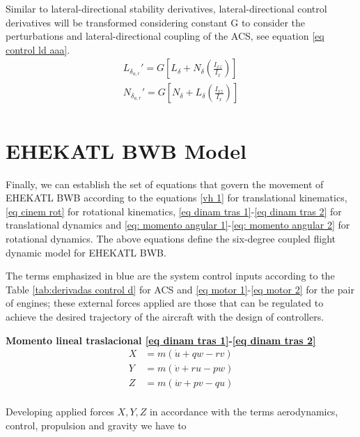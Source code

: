 Similar to lateral-directional stability derivatives, lateral-directional control derivatives will be transformed considering constant G to consider the perturbations and lateral-directional coupling of the ACS, see equation \ref{eq control ld aaa}. 
\begin{gather}
\label{eq control ld aaa}
    L_{\delta_{a,r}} ' = G [L_\delta + N_\delta (\frac{I_{xz}}{I_x})] \\
    N_{\delta_{a,r}} ' = G [N_\delta + L_\delta (\frac{I_{xz}}{I_x})] \\
\end{gather}

\section{EHEKATL BWB Model}

Finally, we can establish the set of equations that govern the movement of EHEKATL BWB according to the equations \ref{vh 1} for translational kinematics, \ref{eq cinem rot} for rotational kinematics, \ref{eq dinam tras 1}-\ref{eq dinam tras 2} for translational dynamics and 
\ref{eq: momento angular 1}-\ref{eq: momento angular 2} for rotational dynamics. The above equations define the six-degree coupled flight dynamic model for EHEKATL BWB.

The terms emphasized in blue are the system control inputs according to the Table \ref{tab:derivadas control d} for ACS and \ref{eq motor 1}-\ref{eq motor 2} for the pair of engines; these external forces applied are those that can be regulated to achieve the desired trajectory of the aircraft with the design of controllers.

\medskip

\textbf{Momento lineal traslacional \ref{eq dinam tras 1}-\ref{eq dinam tras 2}}\\
\begin{align}
\label{eq fuerzas ya 1}
    X &= m (\dot u + qw - rv) \\
    Y &= m (\dot v + ru - pw) \\
    Z &= m (\dot w + pv - qu) \\
\label{eq fuerzas ya 2}
\end{align}

Developing applied forces $X,Y,Z$ in accordance with the terms aerodynamics, control, propulsion and gravity we have to 

